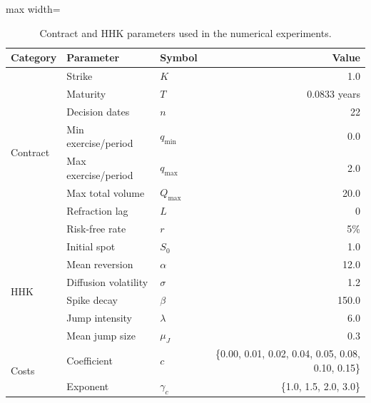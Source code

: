 \documentclass[a4paper,fleqn]{cas-dc}
\begin{document}
\begin{table}[htbp]
    \centering
    \caption{Contract and HHK parameters used in the numerical experiments.}
    \label{tab:contract_params}
    \begin{adjustbox}{max width=\linewidth}
        \begin{tabular}{lllr}
            \toprule
            Category & Parameter            & Symbol     & Value                                              \\
            \midrule
            \multirow{8}{*}{Contract}
                     & Strike               & $K$        & 1.0                                                \\
                     & Maturity             & $T$        & 0.0833 years                                       \\
                     & Decision dates       & $n$        & 22                                                 \\
                     & Min exercise/period  & $q_{\min}$ & 0.0                                                \\
                     & Max exercise/period  & $q_{\max}$ & 2.0                                                \\
                     & Max total volume     & $Q_{\max}$ & 20.0                                               \\
                     & Refraction lag       & $L$        & 0                                                  \\
                     & Risk-free rate       & $r$        & 5\%                                                \\
            \midrule
            \multirow{6}{*}{HHK}
                     & Initial spot         & $S_0$      & 1.0                                                \\
                     & Mean reversion       & $\alpha$   & 12.0                                               \\
                     & Diffusion volatility & $\sigma$   & 1.2                                                \\
                     & Spike decay          & $\beta$    & 150.0                                              \\
                     & Jump intensity       & $\lambda$  & 6.0                                                \\
                     & Mean jump size       & $\mu_J$    & 0.3                                                \\
            \midrule
            \multirow{2}{*}{Costs}
                     & Coefficient          & $c$        & \{0.00, 0.01, 0.02, 0.04, 0.05, 0.08, 0.10, 0.15\} \\
                     & Exponent             & $\gamma_c$ & \{1.0, 1.5, 2.0, 3.0\}                             \\
            \bottomrule
        \end{tabular}
    \end{adjustbox}
\end{table}
\end{document}
